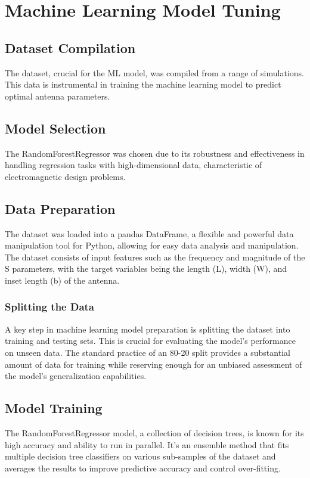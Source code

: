 \documentclass[a4paper,12pt]{report}
\begin{document}
\section{Machine Learning Model Tuning}
\label{sec:preparing_dataset_and_fitting_model}

\subsection{Dataset Compilation}
The dataset, crucial for the ML model, was compiled from a range of simulations. This data is instrumental in training the machine learning model to predict optimal antenna parameters. 

\subsection{Model Selection}
The RandomForestRegressor was chosen due to its robustness and effectiveness in handling regression tasks with high-dimensional data, characteristic of electromagnetic design problems.

\subsection{Data Preparation}
The dataset was loaded into a pandas DataFrame, a flexible and powerful data manipulation tool for Python, allowing for easy data analysis and manipulation. The dataset consists of input features such as the frequency and magnitude of the S parameters, with the target variables being the length (L), width (W), and inset length (b) of the antenna.

\subsubsection{Splitting the Data}
A key step in machine learning model preparation is splitting the dataset into training and testing sets. This is crucial for evaluating the model's performance on unseen data. The standard practice of an 80-20 split provides a substantial amount of data for training while reserving enough for an unbiased assessment of the model's generalization capabilities.

\subsection{Model Training}
The RandomForestRegressor model, a collection of decision trees, is known for its high accuracy and ability to run in parallel. It's an ensemble method that fits multiple decision tree classifiers on various sub-samples of the dataset and averages the results to improve predictive accuracy and control over-fitting.
\end{document}
